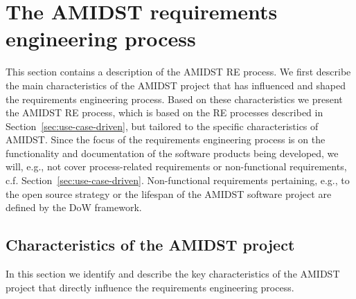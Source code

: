 \section{The AMIDST requirements engineering process}
\label{sec:AmidstRequirementProcess}

This section contains a description of the AMIDST RE process.  We first describe the main characteristics of the AMIDST project that
has influenced and shaped the requirements engineering process. Based on these characteristics we present the
AMIDST RE process, which is based on the RE processes described in
Section~\ref{sec:use-case-driven}, but tailored to the specific characteristics of AMIDST. Since the focus of the requirements engineering process
is on the functionality and documentation of the software products being developed, we will, e.g., not cover
process-related requirements or non-functional requirements, c.f. Section~\ref{sec:use-case-driven}. Non-functional
requirements pertaining, e.g., to the open source strategy or the lifespan of the AMIDST software project are defined by the DoW framework.





\subsection{Characteristics of the AMIDST project}
\label{sec:characteristics}

In this section we identify and describe the key characteristics of the AMIDST project that directly influence the requirements
engineering process. 


